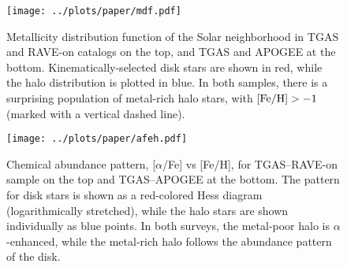 \documentclass[apj, twocolappendix, numberedappendix, appendixfloats]{emulateapj}
\begin{document}
\begin{figure}
\begin{center}
\texttt{[image: ../plots/paper/mdf.pdf]}
\caption{Metallicity distribution function of the Solar neighborhood in TGAS and RAVE-on catalogs on the top, and TGAS and APOGEE at the bottom.
Kinematically-selected disk stars are shown in red, while the halo distribution is plotted in blue.
In both samples, there is a surprising population of metal-rich halo stars, with $\rm[Fe/H]>-1$ (marked with a vertical dashed line).}
\label{fig:mdf}
\end{center}
\end{figure}

\begin{figure}
\begin{center}
\texttt{[image: ../plots/paper/afeh.pdf]}
\caption{Chemical abundance pattern, [$\alpha$/Fe] vs [Fe/H], for TGAS--RAVE-on sample on the top and TGAS--APOGEE at the bottom.
The pattern for disk stars is shown as a red-colored Hess diagram (logarithmically stretched), while the halo stars are shown individually as blue points.
In both surveys, the metal-poor halo is $\alpha$-enhanced, while the metal-rich halo follows the abundance pattern of the disk.}
\label{fig:afeh}
\end{center}
\end{figure}
\end{document}
